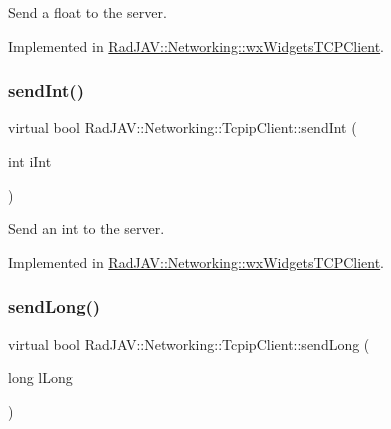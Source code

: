 Send a float to the server. 



Implemented in \mbox{\hyperlink{class_rad_j_a_v_1_1_networking_1_1wx_widgets_t_c_p_client_ad683dafeb275ab9b1dd60bcd1f177107}{Rad\+J\+A\+V\+::\+Networking\+::wx\+Widgets\+T\+C\+P\+Client}}.

\mbox{\label{class_rad_j_a_v_1_1_networking_1_1_tcpip_client_a55e9334efa84818084a55b8121faaf2f}} 
\subsubsection{\texorpdfstring{send\+Int()}{sendInt()}}
{\footnotesize\ttfamily virtual bool Rad\+J\+A\+V\+::\+Networking\+::\+Tcpip\+Client\+::send\+Int (\begin{DoxyParamCaption}\item[{int}]{i\+Int }\end{DoxyParamCaption})\hspace{0.3cm}{\ttfamily [pure virtual]}}



Send an int to the server. 



Implemented in \mbox{\hyperlink{class_rad_j_a_v_1_1_networking_1_1wx_widgets_t_c_p_client_a8463c6778160ef13bfd87dac47676614}{Rad\+J\+A\+V\+::\+Networking\+::wx\+Widgets\+T\+C\+P\+Client}}.

\mbox{\label{class_rad_j_a_v_1_1_networking_1_1_tcpip_client_aceb6808d0f664dca25ebd56ca1d487ed}} 
\subsubsection{\texorpdfstring{send\+Long()}{sendLong()}}
{\footnotesize\ttfamily virtual bool Rad\+J\+A\+V\+::\+Networking\+::\+Tcpip\+Client\+::send\+Long (\begin{DoxyParamCaption}\item[{long}]{l\+Long }\end{DoxyParamCaption})\hspace{0.3cm}{\ttfamily [pure virtual]}}



